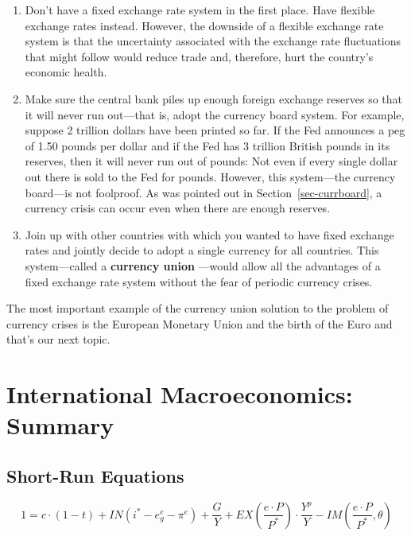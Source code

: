 \documentclass[
  letterpaper,
]{book}
\theoremstyle{plain}
\theoremstyle{remark}
\begin{document}
\begin{enumerate}
\def\labelenumi{\arabic{enumi}.}
\item
  Don't have a fixed exchange rate system in the first place. Have
  flexible exchange rates instead. However, the downside of a flexible
  exchange rate system is that the uncertainty associated with the
  exchange rate fluctuations that might follow would reduce trade and,
  therefore, hurt the country's economic health.
\item
  Make sure the central bank piles up enough foreign exchange reserves
  so that it will never run out---that is, adopt the currency board
  system. For example, suppose 2 trillion dollars have been printed so
  far. If the Fed announces a peg of 1.50 pounds per dollar and if the
  Fed has 3 trillion British pounds in its reserves, then it will never
  run out of pounds: Not even if every single dollar out there is sold
  to the Fed for pounds. However, this system---the currency board---is
  not foolproof. As was pointed out in Section~\ref{sec-currboard}, a
  currency crisis can occur even when there are enough reserves.
\item
  Join up with other countries with which you wanted to have fixed
  exchange rates and jointly decide to adopt a single currency for all
  countries. This system---called a \textbf{currency union}
  ---would allow all the advantages of a fixed
  exchange rate system without the fear of periodic currency crises.
\end{enumerate}

The most important example of the currency union solution to the problem
of currency crises is the European Monetary
Union and the birth of the Euro and
that's our next topic.


\chapter{International Macroeconomics:
Summary}\label{sec-intmac_summary_tables}

\section{Short-Run Equations}

\[
1=c\cdot (1-t)+IN(i^*-e_g^e-\pi^e)+\frac{G}{Y}+EX\left(\frac{e\cdot P}{P^*}\right)\cdot \frac{Y^p}{Y}-IM\left(\frac{e\cdot P}{P^*},\theta\right)
\]
\end{document}
